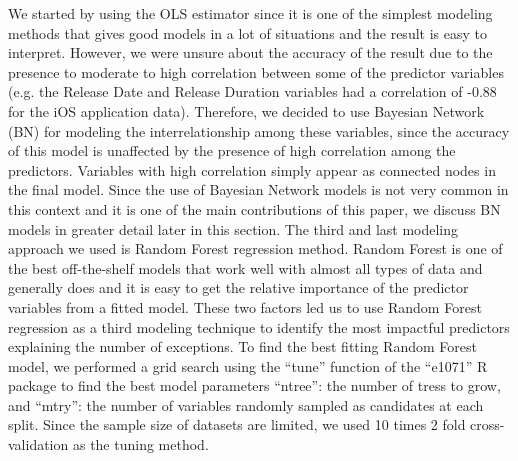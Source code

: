 \documentclass[smallcondensed]{svjour3}     %
\begin{document}
We started by using the OLS estimator since it is one of the simplest modeling methods that gives good models in a lot of situations and the result is easy to interpret. However, we were unsure about the accuracy of the result due to the presence to moderate to high correlation between some of the predictor variables (e.g. the Release Date and Release Duration variables had a correlation of -0.88 for the iOS application data). 
Therefore, we decided to use Bayesian Network (BN) for modeling the interrelationship among these variables, since the accuracy of this model is unaffected by the presence of high correlation among the predictors. Variables with high correlation simply appear as connected nodes in the final model. Since the use of Bayesian Network models is not very common in this context and it is one of the main contributions of this paper, we discuss BN models in greater detail later in this section. The third and last modeling approach we used is Random Forest regression method. Random Forest is one of the best off-the-shelf models that work well with almost all types of data and generally does  and it is easy to get the relative importance of the predictor variables from a fitted model. These two factors led us to use Random Forest regression as a third modeling technique to identify the most impactful predictors explaining the number of exceptions. To find the best fitting Random Forest model, we performed a grid search using the ``tune'' function of the ``e1071'' R package to find the best model parameters ``ntree'': the number of tress to grow, and ``mtry'': the number of variables randomly sampled as candidates at each split. Since the sample size of datasets are limited, we used 10 times 2 fold cross-validation as the tuning method. 
\end{document}

